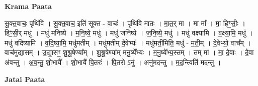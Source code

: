 \documentclass[17pt]{extarticle}
\begin{document}
\textbf{Krama Paata} \newline

सू॒क्त॒वाचः॒ पृथि॑वि । सू॒क्त॒वाच॒ इति॑ सूक्त - वाचः॑ । पृथि॑वि मातः । मा॒त॒र् मा । मा मा᳚ । मा॒ हिꣳ॒॒सीः॒ । हिꣳ॒॒सी॒र् मधु॑ । मधु॑ मनिष्ये । म॒नि॒ष्ये॒ मधु॑ । मधु॑ जनिष्ये । ज॒नि॒ष्ये॒ मधु॑ । मधु॑ वक्ष्यामि । व॒क्ष्या॒मि॒ मधु॑ । मधु॑ वदिष्यामि । व॒दि॒ष्या॒मि॒ मधु॑मतीम् । मधु॑मतीम् दे॒वेभ्यः॑ । मधु॑मती॒मिति॒ मधु॑ - म॒ती॒म् । दे॒वेभ्यो॒ वाच᳚म् । वाच॑मुद्यासम् । उ॒द्या॒सꣳ॒॒ शु॒श्रू॒षेण्या᳚म् । शु॒श्रू॒षेण्या᳚म् मनु॒ष्ये᳚भ्यः । म॒नु॒ष्ये᳚भ्य॒स्तम् । तम् मा᳚ । मा॒ दे॒वाः । दे॒वा अ॑वन्तु । अ॒व॒न्तु॒ शो॒भायै᳚ । शो॒भायै॑ पि॒तरः॑ । पि॒तरो ऽनु॑ । अनु॑मदन्तु । 
म॒द॒न्त्विति॑ मदन्तु । \newline

\textbf{Jatai Paata} \newline
\end{document}
